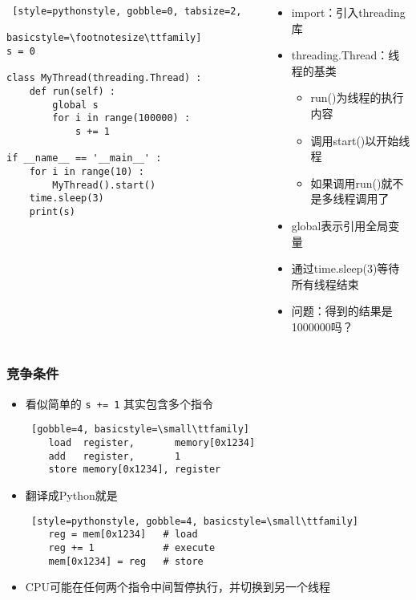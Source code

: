 \begin{CJK}{UTF8}{gbsn}
\begin{frame} [fragile]
\begin{columns}[T]
\begin{column}[T]{.5\textwidth}
\begin{lstlisting} [style=pythonstyle, gobble=0, tabsize=2,
								basicstyle=\footnotesize\ttfamily]
s = 0

class MyThread(threading.Thread) :
	def run(self) :
		global s
		for i in range(100000) :
			s += 1

if __name__ == '__main__' :
	for i in range(10) :
		MyThread().start()
	time.sleep(3)
	print(s)
			\end{lstlisting}
		\end{column}
		\begin{column}[T]{.5\textwidth}
			\begin{itemize}
			\item import：引入threading库
			\item threading.Thread：线程的基类
				\begin{itemize}
				\item run()为线程的执行内容
				\item 调用start()以开始线程
				\item 如果调用run()就不是多线程调用了
				\end{itemize}
			\item global表示引用全局变量
			\item 通过time.sleep(3)等待所有线程结束
			\item 问题：得到的结果是1000000吗？
			\end{itemize}
		\end{column}
	\end{columns}
\end{frame}

\begin{frame}[fragile]
	\frametitle{竞争条件}
	\begin{itemize}
	\item 看似简单的 \texttt{s += 1} 其实包含多个指令
	\begin{lstlisting} [gobble=4, basicstyle=\small\ttfamily]
	load  register,       memory[0x1234]
	add   register,       1
	store memory[0x1234], register
	\end{lstlisting}
	\item 翻译成Python就是
	\begin{lstlisting} [style=pythonstyle, gobble=4, basicstyle=\small\ttfamily]
	reg = mem[0x1234]	# load
	reg += 1			# execute
	mem[0x1234] = reg	# store
	\end{lstlisting}
	\item CPU可能在任何两个指令中间暂停执行，并切换到另一个线程
	\end{itemize}
\end{frame}


\end{CJK}
